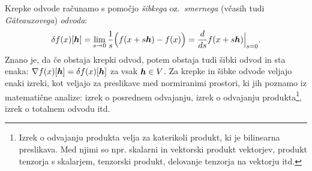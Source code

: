 Krepke odvode računamo s pomočjo \emph{šibkega} oz.~\emph{smernega} (včasih tudi \emph{Gâteauxovega}) \emph{odvoda}:
\begin{equation*}
	\delta f(x)[\boldsymbol h]=\lim_{s\to 0}\frac{1}{s}\Big(f(x+s\boldsymbol h)-f(x)\Big)=
	\frac{d}{ds}f(x+s\boldsymbol h)\Big|_{s=0}.
\end{equation*}
Znano je, da če obstaja krepki odvod,
potem obstaja tudi šibki odvod in sta enaka: $\nabla f(x)[\boldsymbol h]=\delta f(x)[\boldsymbol h]$ za vsak $\boldsymbol h\in V$.
Za krepke in šibke odvode veljajo enaki izreki, kot veljajo za preslikave med normiranimi prostori, ki jih
poznamo iz matematične analize: izrek o posrednem odvajanju, izrek o odvajanju produkta\footnote{
Izrek o odvajanju produkta velja za katerikoli produkt, ki je bilinearna preslikava. Med njimi so
npr. skalarni in vektorski produkt vektorjev, produkt tenzorja s skalarjem, tenzorski produkt,
delovanje tenzorja na vektorju itd.},
izrek o totalnem odvodu itd.

